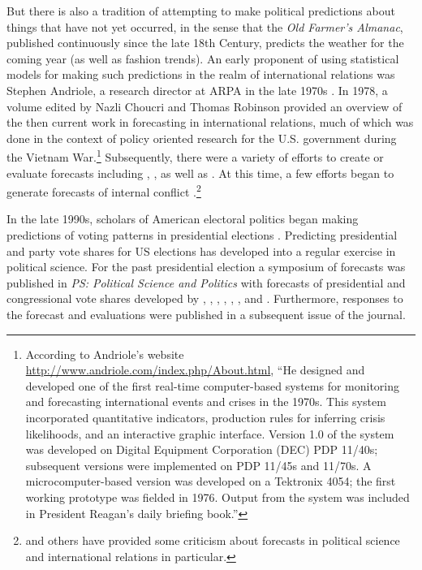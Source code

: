\documentclass[pdftex,12pt,fullpage,oneside]{amsart}
\begin{document}
But there is also a tradition of attempting to make political
predictions about things that have not yet occurred, in the sense that
the \emph{Old Farmer's Almanac}, published continuously since the late
18th Century, predicts the weather for the coming year (as well as
fashion trends). An early proponent of using statistical models for
making such predictions in the realm of international relations was
Stephen Andriole, a research director at ARPA in the late 1970s
\citep{Andriole:Young:1977}. In 1978, a volume edited by Nazli Choucri
and Thomas Robinson \nocite{Chocuri:Robinson:1978} provided an
overview of the then current work in forecasting in international
relations, much of which was done in the context of policy oriented
research for the U.S. government during the Vietnam
War.\footnote{According to Andriole's website
  \url{http://www.andriole.com/index.php/About.html}, ``He designed
  and developed one of the first real-time computer-based systems for
  monitoring and forecasting international events and crises in the
  1970s. This system incorporated quantitative indicators, production
  rules for inferring crisis likelihoods, and an interactive graphic
  interface. Version 1.0 of the system was developed on Digital
  Equipment Corporation (DEC) PDP 11/40s; subsequent versions were
  implemented on PDP 11/45s and 11/70s. A microcomputer-based version
  was developed on a Tektronix 4054; the first working prototype was
  fielded in 1976. Output from the system was included in President
  Reagan's daily briefing book.''}  Subsequently, there were a variety
of efforts to create or evaluate forecasts including
\citet{Freeman:Job:1979}, \citet{Singer:Wallace:1979}, as well as
\citet{Vincent:1980}.  At this time, a few efforts began to generate
forecasts of internal conflict
\citep[e.g.,][]{Gurr:Lichbach:1986}.\footnote{\citet{Doran:1999} and
  others have provided some criticism about forecasts in political
  science and international relations in particular.}

In the late 1990s, scholars of American electoral politics began
making predictions of voting patterns in presidential elections
\citep{Campbell:1992}. Predicting presidential and party vote shares
for US elections has developed into a regular exercise in political
science. For the past presidential election a symposium of forecasts
was published in \emph{PS: Political Science and Politics} with
forecasts of presidential and congressional vote shares developed by
\citet{Campbell:2008}, \citet{Norpoth:2008},
\citet{Lewis-Beck:Tien:2008}, \citet{Abramowitz:2008},
\citet{Erikson:Wlezien:2008}, \citet{Holbrook:2008},
\citet{Lockerbie:2008} and \citet{Cuzan:Bundrick:2008}. Furthermore,
responses to the forecast and evaluations were published in a
subsequent issue of the journal.
\end{document}
